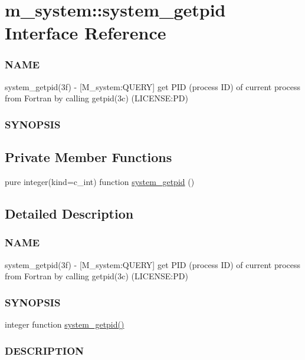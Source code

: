 \hypertarget{interfacem__system_1_1system__getpid}{}\section{m\+\_\+system\+:\+:system\+\_\+getpid Interface Reference}
\label{interfacem__system_1_1system__getpid}


\subsubsection*{N\+A\+ME}

system\+\_\+getpid(3f) -\/ \mbox{[}M\+\_\+system\+:Q\+U\+E\+RY\mbox{]} get P\+ID (process ID) of current process from Fortran by calling getpid(3c) (L\+I\+C\+E\+N\+SE\+:PD) \subsubsection*{S\+Y\+N\+O\+P\+S\+IS} 


\subsection*{Private Member Functions}
\begin{DoxyCompactItemize}
\item 
pure integer(kind=c\+\_\+int) function \mbox{\hyperlink{interfacem__system_1_1system__getpid_a57e3dc61f201783198e6dbb4ace1527b}{system\+\_\+getpid}} ()
\end{DoxyCompactItemize}


\subsection{Detailed Description}
\subsubsection*{N\+A\+ME}

system\+\_\+getpid(3f) -\/ \mbox{[}M\+\_\+system\+:Q\+U\+E\+RY\mbox{]} get P\+ID (process ID) of current process from Fortran by calling getpid(3c) (L\+I\+C\+E\+N\+SE\+:PD) \subsubsection*{S\+Y\+N\+O\+P\+S\+IS}

integer function \mbox{\hyperlink{interfacem__system_1_1system__getpid_a57e3dc61f201783198e6dbb4ace1527b}{system\+\_\+getpid()}} \subsubsection*{D\+E\+S\+C\+R\+I\+P\+T\+I\+ON}


